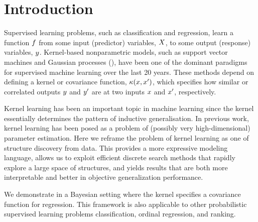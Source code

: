 \documentclass[twoside]{article}
\begin{document}
\section{Introduction}

Supervised learning problems, such as classification and regression, learn a function $f$ from some input (predictor) variables, $X$, to some output (response) variables, $y$.
Kernel-based nonparametric models, such as support vector machines and Gaussian processes (\gp{}), have been one of the dominant paradigms for supervised machine learning over the last 20 years.
These methods depend on defining a kernel or covariance function, $\kappa(x,x')$, which specifies how similar or correlated outputs $y$ and $y'$ are at two inputs $x$ and $x'$, respectively.

Kernel learning has been an important topic in machine learning \citep[e.g.][]{diosan2007evolving,salakhutdinov2008using,Bach_HKL} since the kernel essentially determines the pattern of inductive generalisation.
In previous work, kernel learning has been posed as a problem of (possibly very high-dimensional) parameter estimation.
Here we reframe the problem of kernel learning as one of structure discovery from data.
This provides a more expressive modeling language, allows us to exploit efficient discrete search methods that rapidly explore a large space of structures, and yields results that are both more interpretable and better in objective generalization performance.

We demonstrate  in a Bayesian setting where the kernel specifies a covariance function for \gp{} regression.
This framework is also applicable to other probabilistic supervised learning problems \eg classification, ordinal regression, and ranking.
\end{document}
